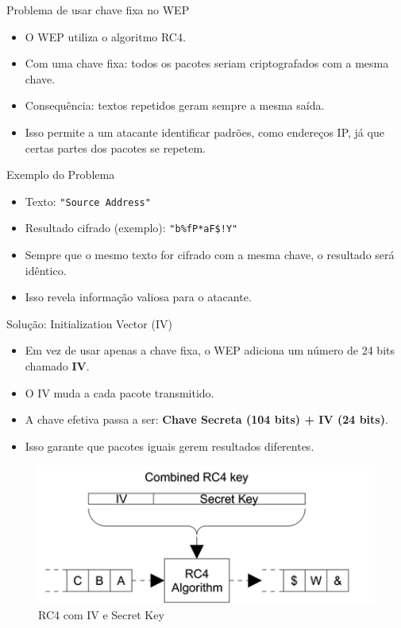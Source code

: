 \begin{frame}{Problema de usar chave fixa no WEP}
    \begin{itemize}
        \item O WEP utiliza o algoritmo RC4.
        \item Com uma chave fixa: todos os pacotes seriam criptografados com a mesma chave.
        \item Consequência: textos repetidos geram sempre a mesma saída.
        \item Isso permite a um atacante identificar padrões, como endereços IP,
              já que certas partes dos pacotes se repetem.
    \end{itemize}

    \begin{block}{Exemplo do Problema}
        \begin{itemize}
            \item Texto: \texttt{"Source Address"}
            \item Resultado cifrado (exemplo): \texttt{"b\%fP*aF\$!Y"}
            \item Sempre que o mesmo texto for cifrado com a mesma chave, o resultado será idêntico.
            \item Isso revela informação valiosa para o atacante.
        \end{itemize}
    \end{block}
\end{frame}

\begin{frame}{Solução: Initialization Vector (IV)}
    \begin{itemize}
        \item Em vez de usar apenas a chave fixa, o WEP adiciona um número de 24 bits chamado \textbf{IV}.
        \item O IV muda a cada pacote transmitido.
        \item A chave efetiva passa a ser: \textbf{Chave Secreta (104 bits) + IV (24 bits)}.
        \item Isso garante que pacotes iguais gerem resultados diferentes.
    \end{itemize}

    \begin{figure}
        \centering
        \includegraphics[width=0.55\linewidth]{Figuras/wep-iv-secret-key.png}
        \caption{RC4 com IV e Secret Key}
    \end{figure}
\end{frame}

